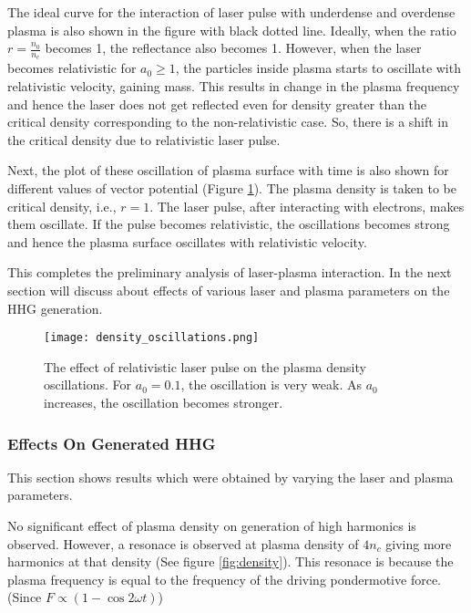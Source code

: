 The ideal curve for the interaction of laser pulse with underdense and overdense plasma is also shown in the figure with black dotted line. Ideally, when the ratio $r = \frac{n_0}{n_c}$ becomes 1, the reflectance also becomes 1. However, when the laser becomes relativistic for $a_0 \ge 1$, the particles inside plasma starts to oscillate with relativistic velocity, gaining mass. This results in change in the plasma frequency and hence the laser does not get reflected even for density greater than the critical density corresponding to the non-relativistic case. So, there is a shift in the critical density due to relativistic laser pulse.

Next, the plot of these oscillation of plasma surface with time is also shown for different values of vector potential (Figure \ref{fig:density_oscillations}). The plasma density is taken to be critical density, i.e., $r=1$. The laser pulse, after interacting with electrons, makes them oscillate. If the pulse becomes relativistic, the oscillations becomes strong and hence the plasma surface oscillates with relativistic velocity.


This completes the preliminary analysis of laser-plasma interaction. In the next section will discuss about effects of various laser and plasma parameters on the HHG generation.

\begin{figure}[H]
    \centering
    \texttt{[image: density\_oscillations.png]}
    \caption{The effect of relativistic laser pulse on the plasma density oscillations. For $a_0=0.1$, the oscillation is very weak. As $a_0$ increases, the oscillation becomes stronger.}
    \label{fig:density_oscillations}
\end{figure}

\subsubsection{Effects On Generated HHG}
This section shows results which were obtained by varying the laser and plasma parameters.

No significant effect of plasma density on generation of high harmonics is observed. However, a resonace is observed at plasma density of $4n_c$ giving more harmonics at that density (See figure \ref{fig:density}). This resonace is because the plasma frequency is equal to the frequency of the driving pondermotive force. (Since $F\propto (1-\cos{2\omega t})$)

